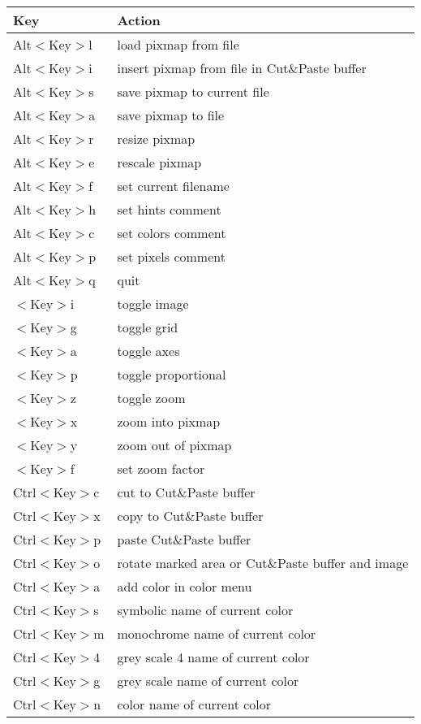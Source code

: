 \begin{tabular}{|p{4cm}|p{10cm}|}
\hline
Key			& Action\\\hline\hline
Alt$<$Key$>$l		& load pixmap from file\\\hline
Alt$<$Key$>$i		& insert pixmap from file in Cut\&Paste
buffer\\\hline
Alt$<$Key$>$s		& save pixmap to current file\\\hline
Alt$<$Key$>$a		& save pixmap to file\\\hline
Alt$<$Key$>$r		& resize pixmap\\\hline
Alt$<$Key$>$e		& rescale pixmap\\\hline
Alt$<$Key$>$f		& set current filename\\\hline
Alt$<$Key$>$h		& set hints comment\\\hline
Alt$<$Key$>$c		& set colors comment\\\hline
Alt$<$Key$>$p		& set pixels comment\\\hline
Alt$<$Key$>$q		& quit\\\hline
$<$Key$>$i		& toggle image\\\hline
$<$Key$>$g		& toggle grid\\\hline
$<$Key$>$a		& toggle axes\\\hline
$<$Key$>$p		& toggle proportional\\\hline
$<$Key$>$z		& toggle zoom\\\hline
$<$Key$>$x		& zoom into pixmap\\\hline
$<$Key$>$y		& zoom out of pixmap\\\hline
$<$Key$>$f		& set zoom factor\\\hline
Ctrl$<$Key$>$c		& cut to Cut\&Paste buffer\\\hline
Ctrl$<$Key$>$x		& copy to Cut\&Paste buffer\\\hline
Ctrl$<$Key$>$p		& paste Cut\&Paste buffer\\\hline
Ctrl$<$Key$>$o		& rotate marked area or Cut\&Paste buffer and image\\\hline
Ctrl$<$Key$>$a		& add color in color menu\\\hline
Ctrl$<$Key$>$s		& symbolic name of current color\\\hline
Ctrl$<$Key$>$m		& monochrome name of current color\\\hline
Ctrl$<$Key$>$4		& grey scale 4 name of current color\\\hline
Ctrl$<$Key$>$g		& grey scale name of current color\\\hline
Ctrl$<$Key$>$n		& color name of current color\\\hline

\end{tabular}
